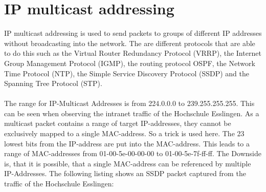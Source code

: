 \section{IP multicast addressing}
IP multicast addressing is used to send packets to groups of different IP addresses without broadcasting into the network. The are different protocols that are able to do this such as the Virtual Router Redundancy Protocol (VRRP), the Internet Group Management Protocol (IGMP), the routing protocol OSPF, the Network Time Protocol (NTP), the Simple Service Discovery Protocol (SSDP) and the Spanning Tree Protocol (STP). 
\\\\
The range for IP-Multicast Addresses is from 224.0.0.0 to 239.255.255.255. This can be seen when observing the intranet traffic of the Hochschule Esslingen. As a multicast packet contains a range of target IP-addresses, they cannot be exclusively mapped to a single MAC-address. So a trick is used here. The 23 lowest bits from the IP-address are put into the MAC-address. This leads to a range of MAC-addresses from 01-00-5e-00-00-00 to 01-00-5e-7f-ff-ff. The Downside is, that it is possible, that a single MAC-address can be referenced by multiple IP-Addresses. The following listing shows an SSDP packet captured from the traffic of the Hochschule Esslingen:
